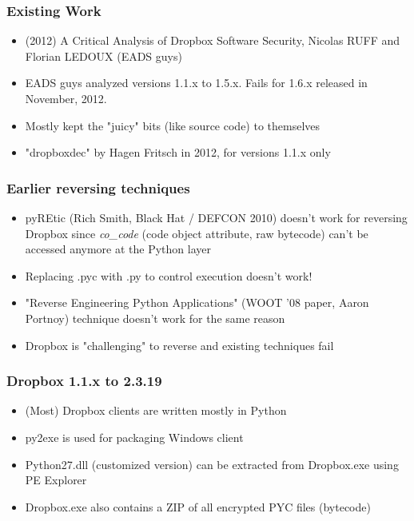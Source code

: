 \documentclass{beamer}
\newcommand\myfont{\fontsize{14}{20}\selectfont}
\begin{document}
\begin{frame}
\frametitle{Existing Work}
\myfont
\begin{itemize}
\itemsep 0.7em
\item (2012) A Critical Analysis of Dropbox Software Security, Nicolas RUFF and Florian LEDOUX (EADS guys)
\item EADS guys analyzed versions 1.1.x to 1.5.x. Fails for 1.6.x released in November, 2012.
\item Mostly kept the "juicy" bits (like source code) to themselves
\item "dropboxdec" by Hagen Fritsch in 2012, for versions 1.1.x only
\end{itemize}
\end{frame}

\begin{frame}
\frametitle{Earlier reversing techniques}
\begin{itemize}
	\itemsep 1.8em
	\item pyREtic (Rich Smith, Black Hat / DEFCON 2010) doesn't work for reversing Dropbox since \emph{co\_code} (code object attribute, raw bytecode) can't be accessed anymore at the Python layer
	\item Replacing .pyc with .py to control execution doesn't work!
	\item "Reverse Engineering Python Applications" (WOOT '08 paper, Aaron Portnoy) technique doesn't work for the same reason
	\item Dropbox is "challenging" to reverse and existing techniques fail
\end{itemize}
\end{frame}

\begin{frame}
\frametitle{Dropbox 1.1.x to 2.3.19}
\myfont
\begin{itemize}
\itemsep 1em
\item (Most) Dropbox clients are written mostly in Python

\item py2exe is used for packaging Windows client

\item Python27.dll (customized version) can be extracted from Dropbox.exe using PE Explorer

\item Dropbox.exe also contains a ZIP of all encrypted PYC files (bytecode)
\end{itemize}
\end{frame}
\end{document}
